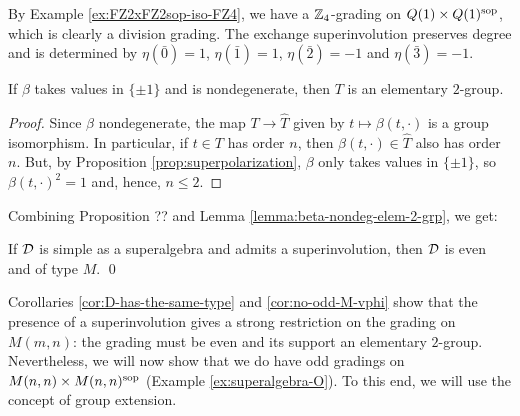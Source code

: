 \begin{ex}\label{ex:FZ4-revisited}
	By Example \ref{ex:FZ2xFZ2sop-iso-FZ4}, we have a $\mathbb{Z}_4$-grading on $Q(1)\times Q(1)^{\mathrm{sop}}$, which is clearly a division grading.
	The exchange superinvolution preserves degree and is determined by $\eta (\bar 0) = 1$, $\eta (\bar 1) = 1$, $\eta (\bar 2) = -1$ and $\eta (\bar 3) = -1$.
\end{ex}

\begin{lemma}\label{lemma:beta-nondeg-elem-2-grp}
	If $\beta$ takes values in $\{ \pm 1 \}$ and is nondegenerate, then $T$ is an elementary $2$-group.
\end{lemma}

\begin{proof}
	Since $\beta$ nondegenerate, the map $T \to \widehat T$ given by $t \mapsto \beta(t, \cdot)$ is a group isomorphism.
	In particular, if $t\in T$ has order $n$, then $\beta(t, \cdot)\in \widehat T$ also has order $n$.
	But, by Proposition \ref{prop:superpolarization}, $\beta$ only takes values in $\{ \pm 1\}$, so  $\beta(t, \cdot )^2 =1$ and, hence, $ n \leq 2$.
\end{proof}

Combining Proposition ??  %
and Lemma \ref{lemma:beta-nondeg-elem-2-grp}, we get:

\begin{cor}\label{cor:no-odd-M-vphi}
	If $\mathcal{D}$ is simple as a superalgebra and admits a superinvolution, then $\mathcal{D}$ is even and of type $M$. \qed
\end{cor}


Corollaries \ref{cor:D-has-the-same-type} and \ref{cor:no-odd-M-vphi} show that the presence of a superinvolution gives a strong restriction on the grading on $M(m,n)$: the grading must be even and its support an elementary $2$-group.
Nevertheless, we will now show that we do have odd gradings on $M(n,n)\times M(n,n)^{\mathrm{sop}}$ (Example \ref{ex:superalgebra-O}).
To this end, we will use the concept of group extension.



